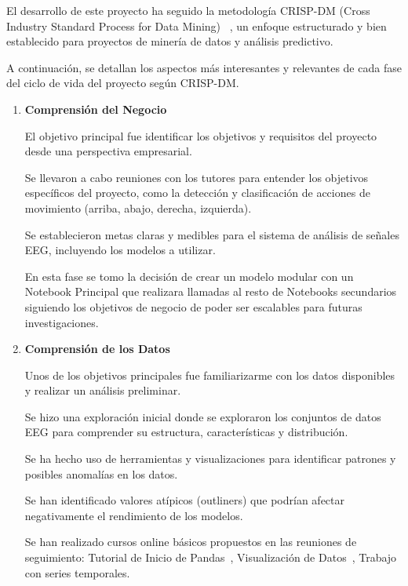 


El desarrollo de este proyecto ha seguido la metodología CRISP-DM (Cross Industry Standard Process for Data Mining) ~\cite{wiki:CRISP}, un enfoque estructurado y bien establecido para proyectos de minería de datos y análisis predictivo. 

A continuación, se detallan los aspectos más interesantes y relevantes de cada fase del ciclo de vida del proyecto según CRISP-DM.


\begin{enumerate}
\def\labelenumi{\arabic{enumi}.}	
\item
\textbf{Comprensión del Negocio}

El objetivo principal fue identificar los objetivos y requisitos del proyecto desde una perspectiva empresarial.

Se llevaron a cabo reuniones con los tutores para entender los objetivos específicos del proyecto, como la detección y clasificación de acciones de movimiento (arriba, abajo, derecha, izquierda).

Se establecieron metas claras y medibles para el sistema de análisis de señales EEG, incluyendo los modelos a utilizar.

En esta fase se tomo la decisión de crear un modelo modular con un Notebook Principal que realizara llamadas al resto de Notebooks secundarios siguiendo los objetivos de negocio de poder ser escalables para futuras investigaciones.


\item
\textbf{Comprensión de los Datos}

Unos de los objetivos principales fue familiarizarme con los datos disponibles y realizar un análisis preliminar.

Se hizo una exploración inicial donde se exploraron los conjuntos de datos EEG para comprender su estructura, características y distribución.

Se ha hecho uso de herramientas y visualizaciones para identificar patrones y posibles anomalías en los datos.

Se han identificado valores atípicos (outliners) que podrían afectar negativamente el rendimiento de los modelos.

Se han realizado cursos online básicos propuestos en las reuniones de seguimiento:
Tutorial de Inicio de Pandas~\cite{curso:a}, Visualización de Datos~\cite{curso:b}, Trabajo con series temporales.~\cite{curso:c}


\end{enumerate}

